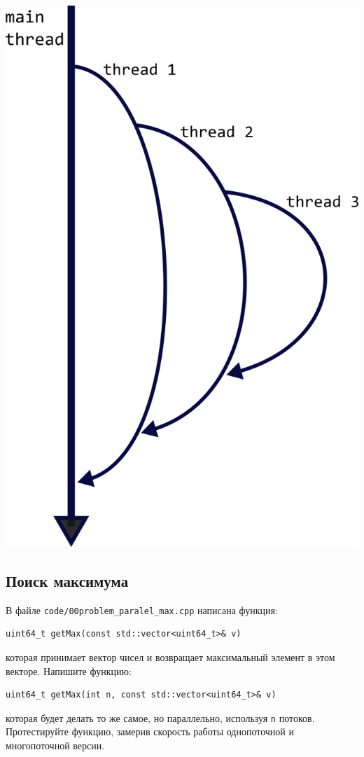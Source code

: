 \documentclass{article}
\begin{document}
\begin{center}
\includegraphics[scale=1]{../images/n_threads_mat.png}
\end{center}


\subsection{Поиск максимума}
В файле \texttt{code/00problem\_paralel\_max.cpp} написана функция:
\begin{lstlisting}
uint64_t getMax(const std::vector<uint64_t>& v)
\end{lstlisting}
которая принимает вектор чисел и возвращает максимальный элемент в этом векторе.
Напишите функцию:
\begin{lstlisting}
uint64_t getMax(int n, const std::vector<uint64_t>& v)
\end{lstlisting}
которая будет делать то же самое, но параллельно, используя \texttt{n} потоков.
Протестируйте функцию, замерив скорость работы однопоточной и многопоточной версии.
\end{document}
